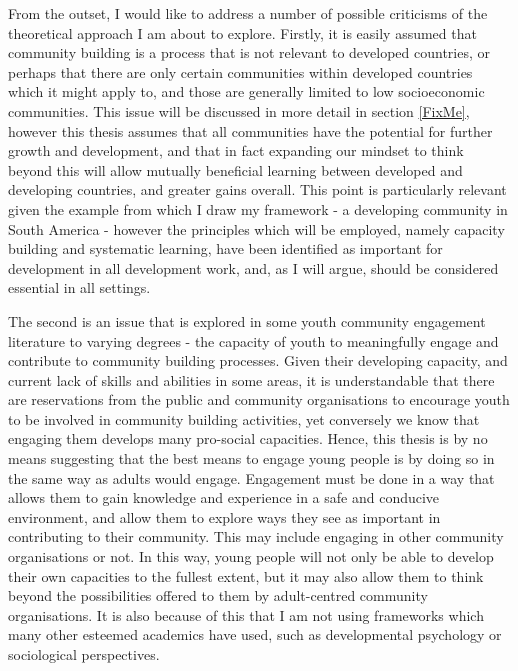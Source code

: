 From the outset, I would like to address a number of possible criticisms of the theoretical approach I am about to explore. Firstly, it is easily assumed that community building is a process that is not relevant to developed countries, or perhaps that there are only certain communities within developed countries which it might apply to, and those are generally limited to low socioeconomic communities. This issue will be discussed in more detail in section \ref{FixMe}, \label{FixMe} %
however this thesis assumes that all communities have the potential for further growth and development, and that in fact expanding our mindset to think beyond this will allow mutually beneficial learning between developed and developing countries, and greater gains overall. This point is particularly relevant given the example from which I draw my framework - a developing community in South America - however the principles which will be employed, namely capacity building and systematic learning, have been identified as important for development in all development work, and, as I will argue, should be considered essential in all settings. 

The second is an issue that is explored in some youth community engagement literature to varying degrees - the capacity of youth to meaningfully engage and contribute to community building processes. Given their developing capacity, and current lack of skills and abilities in some areas, it is understandable that there are reservations from the public and community organisations to encourage youth to be involved in community building activities, yet conversely we know that engaging them develops many pro-social capacities. Hence, this thesis is by no means suggesting that the best means to engage young people is by doing so in the same way as adults would engage. Engagement must be done in a way that allows them to gain knowledge and experience in a safe and conducive environment, and allow them to explore ways they see as important in contributing to their community. This may include engaging in other community organisations or not. In this way, young people will not only be able to develop their own capacities to the fullest extent, but it may also allow them to think beyond the possibilities offered to them by adult-centred community organisations. It is also because of this that I am not using frameworks which many other esteemed academics have used, such as developmental psychology or sociological perspectives. %



